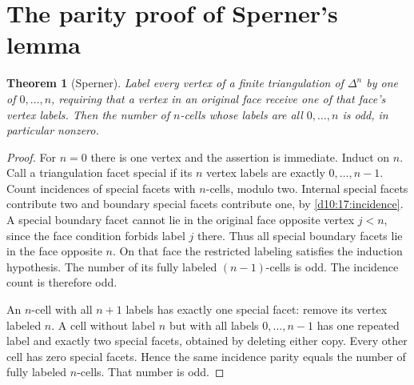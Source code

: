 \documentclass[11pt,oneside,openany]{book}
\newtheorem{theorem}{Theorem}[chapter]
\theoremstyle{definition}
\theoremstyle{remark}
\begin{document}
\section{The parity proof of Sperner's lemma}
\begin{theorem}[Sperner]\label{d10:17:sperner}
Label every vertex of a finite triangulation of $\Delta^n$ by one of
$0,\ldots,n$, requiring that a vertex in an original face receive
one of that face's vertex labels. Then the number of $n$-cells
whose labels are all $0,\ldots,n$ is odd, in particular nonzero.
\end{theorem}
\begin{proof}
For $n=0$ there is one vertex and the assertion is immediate.
Induct on $n$. Call a triangulation facet special if its $n$ vertex
labels are exactly $0,\ldots,n-1$. Count incidences of special
facets with $n$-cells, modulo two. Internal special facets contribute
two and boundary special facets contribute one, by
\cref{d10:17:incidence}.
A special boundary facet cannot lie in the original face opposite
vertex $j<n$, since the face condition forbids label $j$ there.
Thus all special boundary facets lie in the face opposite $n$.
On that face the restricted labeling satisfies the induction
hypothesis. The number of its fully labeled $(n-1)$-cells is odd.
The incidence count is therefore odd.

An $n$-cell with all $n+1$ labels has exactly one special facet:
remove its vertex labeled $n$. A cell without label $n$ but with
all labels $0,\ldots,n-1$ has one repeated label and exactly two
special facets, obtained by deleting either copy. Every other
cell has zero special facets. Hence the same incidence parity
equals the number of fully labeled $n$-cells. That number is odd.
\end{proof}
\end{document}
